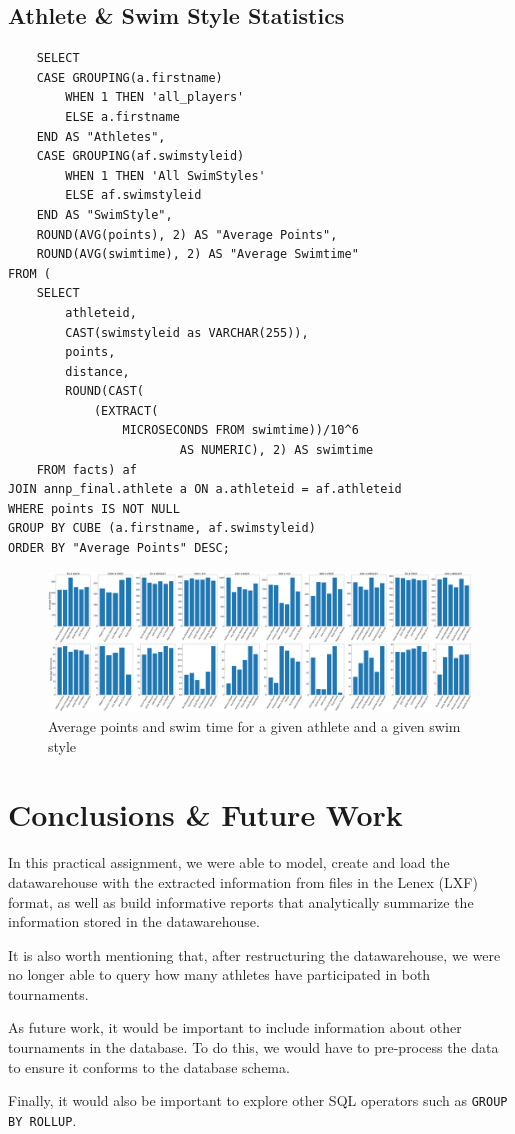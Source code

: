 \documentclass[a4paper, 11pt]{article}
\begin{document}
\subsection{Athlete \& Swim Style Statistics}

\begin{verbatim}
    SELECT
    CASE GROUPING(a.firstname)
        WHEN 1 THEN 'all_players'
        ELSE a.firstname
    END AS "Athletes",
    CASE GROUPING(af.swimstyleid)
        WHEN 1 THEN 'All SwimStyles'
        ELSE af.swimstyleid
    END AS "SwimStyle",
    ROUND(AVG(points), 2) AS "Average Points",
    ROUND(AVG(swimtime), 2) AS "Average Swimtime"
FROM (
    SELECT
        athleteid,
        CAST(swimstyleid as VARCHAR(255)),
        points,
        distance,
        ROUND(CAST(
      		(EXTRACT(
         		MICROSECONDS FROM swimtime))/10^6 
                        AS NUMERIC), 2) AS swimtime
    FROM facts) af
JOIN annp_final.athlete a ON a.athleteid = af.athleteid
WHERE points IS NOT NULL
GROUP BY CUBE (a.firstname, af.swimstyleid)
ORDER BY "Average Points" DESC;
\end{verbatim}

\begin{figure}[H]
    \centering
    \includegraphics[width=\textwidth]{img/download.png}
    \caption{Average points and swim time for a given athlete and a given swim style}
\end{figure}

\pagebreak

\section{Conclusions \& Future Work} \label{sec:conclusion}

In this practical assignment, we were able to model, create and load the
datawarehouse with the extracted information from files in the Lenex (LXF) format, as well as build informative reports that analytically summarize the information stored in the datawarehouse.

It is also worth mentioning that, after restructuring the datawarehouse, we were no longer able to query how many athletes have participated 
in both tournaments.

As future work, it would be important to include information about other tournaments in the database.
To do this, we would have to pre-process the data to ensure it conforms to the database schema.

Finally, it would also be important to explore other SQL operators such as \texttt{GROUP BY ROLLUP}.
\end{document}
